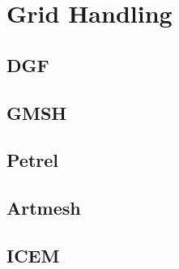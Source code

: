 \section{Grid Handling}
\label{sec:gridhandling}

\subsection{DGF}


\subsection{GMSH}


\subsection{Petrel}


\subsection{Artmesh}


\subsection{ICEM}